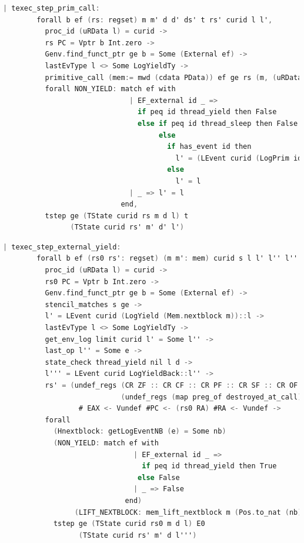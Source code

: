 \begin{lstlisting}[language=C]
    | texec_step_prim_call:
        forall b ef (rs: regset) m m' d d' ds' t rs' curid l l',
          proc_id (uRData l) = curid ->
          rs PC = Vptr b Int.zero ->
          Genv.find_funct_ptr ge b = Some (External ef) ->
          lastEvType l <> Some LogYieldTy ->
          primitive_call (mem:= mwd (cdata PData)) ef ge rs (m, (uRData l, d)) t rs' (m', (ds', d')) ->
          forall NON_YIELD: match ef with
                              | EF_external id _ => 
                                if peq id thread_yield then False
                                else if peq id thread_sleep then False
                                     else
                                       if has_event id then
                                         l' = (LEvent curid (LogPrim id nil 0 (snap_func d)) :: l)
                                       else
                                         l' = l
                              | _ => l' = l
                            end,
          tstep ge (TState curid rs m d l) t 
                (TState curid rs' m' d' l')
\end{lstlisting}

\begin{lstlisting}[language=C]
    | texec_step_external_yield:
        forall b ef (rs0 rs': regset) (m m': mem) curid s l l' l'' l''' nb d e,
          proc_id (uRData l) = curid ->
          rs0 PC = Vptr b Int.zero ->
          Genv.find_funct_ptr ge b = Some (External ef) ->
          stencil_matches s ge ->
          l' = LEvent curid (LogYield (Mem.nextblock m))::l ->
          lastEvType l <> Some LogYieldTy ->
          get_env_log limit curid l' = Some l'' ->
          last_op l'' = Some e ->
          state_check thread_yield nil l d ->
          l''' = LEvent curid LogYieldBack::l'' ->
          rs' = (undef_regs (CR ZF :: CR CF :: CR PF :: CR SF :: CR OF :: nil)
                            (undef_regs (map preg_of destroyed_at_call) rs0)) 
                  # EAX <- Vundef #PC <- (rs0 RA) #RA <- Vundef ->
          forall
            (Hnextblock: getLogEventNB (e) = Some nb)
            (NON_YIELD: match ef with
                               | EF_external id _ => 
                                 if peq id thread_yield then True
                                else False
                               | _ => False
                             end)
                 (LIFT_NEXTBLOCK: mem_lift_nextblock m (Pos.to_nat (nb) - Pos.to_nat(Mem.nextblock m) % nat) = m'),
            tstep ge (TState curid rs0 m d l) E0
                  (TState curid rs' m' d l''')
\end{lstlisting}

